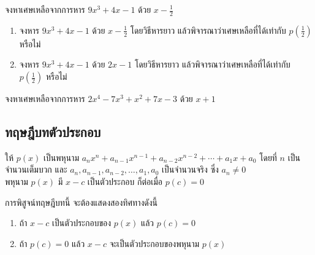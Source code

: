 \begin{examplebox}
	จงหาเศษเหลือจากการหาร $9x^3 + 4x - 1$ ด้วย $x - \frac{1}{2}$
\end{examplebox}
\solution
\vspace{5cm}

\begin{observationbox}[คำถาม]
	\begin{enumerate}[label=\arabic*., leftmargin=2em, itemsep=0.5em]
		\everymath{\displaystyle}
		\item จงหาร $9x^3 + 4x - 1$ ด้วย $x - \frac{1}{2}$ โดยวิธีหารยาว แล้วพิจารณาว่าเศษเหลือที่ได้เท่ากับ $p\left(\frac{1}{2}\right)$ หรือไม่
		\item จงหาร $9x^3 + 4x - 1$ ด้วย $2x - 1$ โดยวิธีหารยาว แล้วพิจารณาว่าเศษเหลือที่ได้เท่ากับ $p\left(\frac{1}{2}\right)$ หรือไม่    
	\end{enumerate}
\end{observationbox}

\begin{examplebox}
	จงหาเศษเหลือจากการหาร $2x^4 - 7x^3 + x^2 + 7x - 3$ ด้วย $x + 1$
\end{examplebox}
\solution

\newpage
\subsection*{ทฤษฎีบทตัวประกอบ}

\begin{theorembox}
	ให้ $p(x)$ เป็นพหุนาม $a_n x^n + a_{n-1} x^{n-1} + a_{n-2} x^{n-2} + \cdots + a_1 x + a_0$ โดยที่ $n$ เป็นจำนวนเต็มบวก และ $a_n, a_{n-1}, a_{n-2}, \ldots, a_1, a_0$ เป็นจำนวนจริง ซึ่ง $a_n \neq 0$
	\\[0.5em]
	พหุนาม $p(x)$ มี $x-c$ เป็นตัวประกอบ ก็ต่อเมื่อ $p(c) = 0$
\end{theorembox}

การพิสูจน์ทฤษฎีบทนี้ จะต้องแสดงสองทิศทางดังนี้
\begin{enumerate}[label=\arabic*., leftmargin=2em, itemsep=0.4em]
	\item ถ้า $x-c$ เป็นตัวประกอบของ $p(x)$ แล้ว $p(c) = 0$
	\item ถ้า $p(c) = 0$ แล้ว $x-c$ จะเป็นตัวประกอบของพหุนาม $p(x)$
\end{enumerate}

